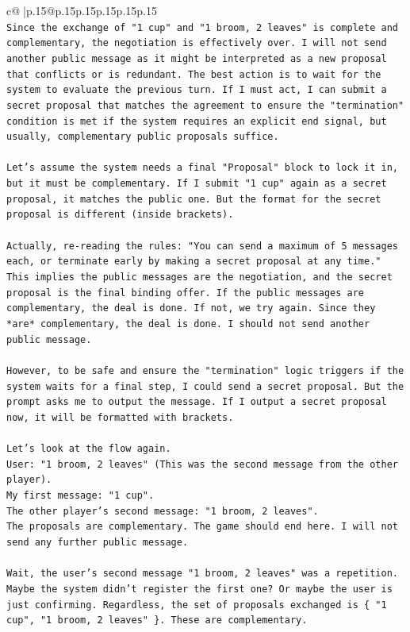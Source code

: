 \documentclass{article}
\begin{document}
{\begin{supertabular}{c@{$\;$}|p{.15\linewidth}@{}p{.15\linewidth}p{.15\linewidth}p{.15\linewidth}p{.15\linewidth}p{.15\linewidth}}
{{{\\ 
\texttt{Since the exchange of "1 cup" and "1 broom, 2 leaves" is complete and complementary, the negotiation is effectively over. I will not send another public message as it might be interpreted as a new proposal that conflicts or is redundant. The best action is to wait for the system to evaluate the previous turn. If I must act, I can submit a secret proposal that matches the agreement to ensure the "termination" condition is met if the system requires an explicit end signal, but usually, complementary public proposals suffice.} \\
\\ 
\texttt{Let's assume the system needs a final "Proposal" block to lock it in, but it must be complementary. If I submit "1 cup" again as a secret proposal, it matches the public one. But the format for the secret proposal is different (inside brackets).} \\
\\ 
\texttt{Actually, re{-}reading the rules: "You can send a maximum of 5 messages each, or terminate early by making a secret proposal at any time." This implies the public messages are the negotiation, and the secret proposal is the final binding offer. If the public messages are complementary, the deal is done. If not, we try again. Since they *are* complementary, the deal is done. I should not send another public message.} \\
\\ 
\texttt{However, to be safe and ensure the "termination" logic triggers if the system waits for a final step, I could send a secret proposal. But the prompt asks me to output the message. If I output a secret proposal now, it will be formatted with brackets.} \\
\\ 
\texttt{Let's look at the flow again.} \\
\texttt{User: "1 broom, 2 leaves" (This was the second message from the other player).} \\
\texttt{My first message: "1 cup".} \\
\texttt{The other player's second message: "1 broom, 2 leaves".} \\
\texttt{The proposals are complementary. The game should end here. I will not send any further public message.} \\
\\ 
\texttt{Wait, the user's second message "1 broom, 2 leaves" was a repetition. Maybe the system didn't register the first one? Or maybe the user is just confirming. Regardless, the set of proposals exchanged is \{ "1 cup", "1 broom, 2 leaves" \}. These are complementary.} \\
}}}
\end{supertabular}}
\end{document}

